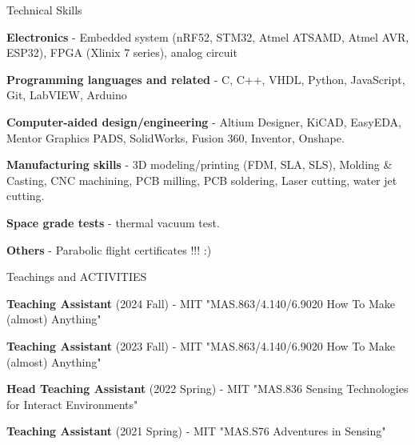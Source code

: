 \documentclass{resume} %
\begin{document}

\begin{rSection}{Technical Skills}

\begin{itemlabel}

\item \textbf{Electronics} - Embedded system (nRF52, STM32, Atmel ATSAMD, Atmel AVR, ESP32), FPGA (Xlinix 7 series), analog circuit
\item \textbf{Programming languages and related} - C, C++, VHDL, Python, JavaScript, Git, LabVIEW, Arduino
\item \textbf{Computer-aided design/engineering} - Altium Designer, KiCAD, EasyEDA, Mentor Graphics PADS, SolidWorks, Fusion 360, Inventor, Onshape.
\item \textbf{Manufacturing skills} - 3D modeling/printing (FDM, SLA, SLS), Molding \& Casting, CNC machining, PCB milling, PCB soldering, Laser cutting, water jet cutting.
\item \textbf{Space grade tests} - thermal vacuum test.
\item \textbf{Others} - Parabolic flight certificates !!! :)
\end{itemlabel}
\end{rSection}

\begin{rSection}{Teachings and ACTIVITIES}

\begin{itemlabel}
\item \textbf{Teaching Assistant} (2024 Fall) - MIT "MAS.863/4.140/6.9020 How To Make (almost) Anything"
\smallskip
\smallskip

\item \textbf{Teaching Assistant} (2023 Fall) - MIT "MAS.863/4.140/6.9020 How To Make (almost) Anything"
\smallskip
\smallskip

\item \textbf{Head Teaching Assistant} (2022 Spring) - MIT "MAS.836 Sensing Technologies for Interact Environments"
\smallskip
\smallskip

\item \textbf{Teaching Assistant} (2021 Spring) - MIT "MAS.S76 Adventures in Sensing"

\end{itemlabel}
\end{rSection}
\end{document}
